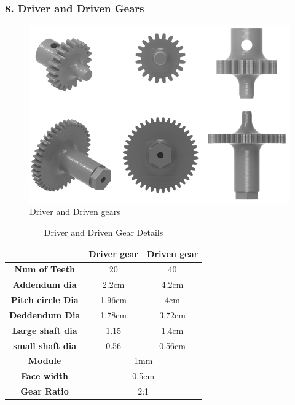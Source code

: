 \documentclass[12pt,a4paper,oneside]{book}
\begin{document}
			\subsubsection*{8. Driver and Driven Gears}
				\begin{figure}[H]
					\centering
					\includegraphics[scale=0.6]{DRIVER AND DRIVEN GEAR}
					\caption{Driver and Driven gears}	 
				\end{figure}
				\begin{table}[H]
				\centering
				\def\arraystretch{1.5}
					\caption{Driver and Driven Gear Details}
					\vspace{0.5cm}
					\begin{tabular}{|c||c|c|}
					\hline
					\textbf{} & \textbf{Driver gear} & \textbf{Driven gear}\\\hline
					\textbf{Num of Teeth} & 20 & 40\\\hline
					\textbf{Addendum dia} & 2.2cm & 4.2cm\\\hline
					\textbf{Pitch circle Dia} & 1.96cm & 4cm\\\hline
					\textbf{Deddendum Dia} & 1.78cm & 3.72cm\\\hline
					\textbf{Large shaft dia} & 1.15 & 1.4cm\\\hline
					\textbf{small shaft dia} & 0.56 & 0.56cm\\\hline
					\textbf{Module} & \multicolumn{2}{|c|}{1mm}\\\hline
					\textbf{Face width} & \multicolumn{2}{|c|}{0.5cm}\\\hline
					\textbf{Gear Ratio} & \multicolumn{2}{|c|}{2:1}\\\hline
					\end{tabular}
				\end{table}
				\pagebreak
				
\end{document}
